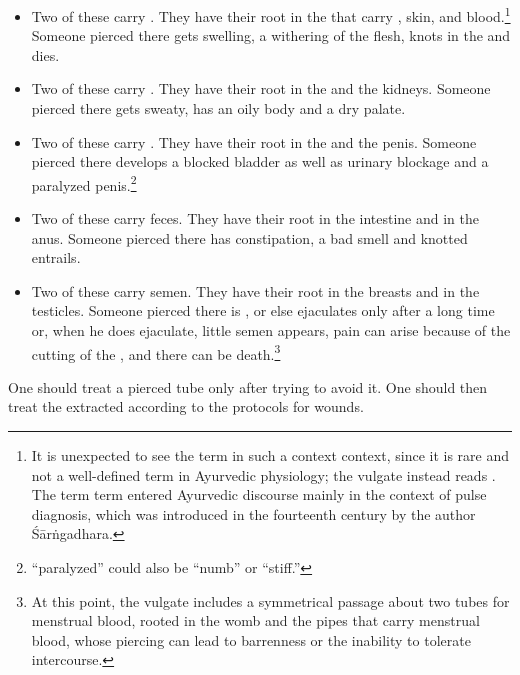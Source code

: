 \begin{refsection}
\begin{translation}
\begin{itemize}
\item 

Two of these carry  .  They have their root in
the  that carry , skin, and
blood.\footnote{It is unexpected to see the term  in such a
    context context, since it is rare and not a well-defined term in
    Ayurvedic physiology; the vulgate instead reads .  The
    term term  entered Ayurvedic discourse mainly in the context
    of pulse diagnosis, which was introduced in the fourteenth century by
    the author Śārṅgadhara.} Someone pierced there gets swelling, a withering of 
    the flesh, knots in the  and dies.

\item 

Two of these carry  .  They have their root in the
 and the kidneys.  Someone pierced there gets
sweaty, has an oily body and a dry palate.

\item 

Two of these carry  .  They have their root in the
 and the penis.  Someone pierced there develops a
blocked bladder as well as urinary blockage and a paralyzed
penis.\footnote{ “paralyzed” could also be “numb” or
    “stiff.”}
    
      \item 
      
Two of these carry  feces.  They have their root in the intestine and
in the anus.  Someone pierced there has constipation, a bad smell and
knotted entrails.

\item Two of these carry  semen.  They have their root in the breasts
and in the testicles.  Someone pierced there is
, or else ejaculates only after a long time or,
when he does ejaculate, little semen appears, pain can arise because
of the cutting of the , and there can be
death.\footnote{At this point, the vulgate includes a symmetrical
    passage about two tubes for menstrual blood, rooted in the womb and
    the pipes that carry menstrual blood, whose piercing can lead to
    barrenness or the inability to tolerate intercourse.}
\end{itemize}

One should treat a pierced tube only after trying to avoid it.  One
should then treat the extracted  according
to the protocols for wounds.



\end{translation}
\end{refsection}
